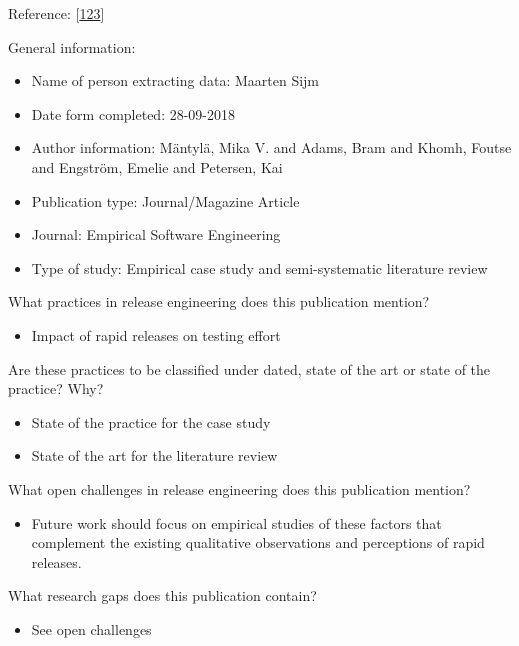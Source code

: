 \documentclass[]{book}
\providecommand{\tightlist}{%
  \setlength{\itemsep}{0pt}\setlength{\parskip}{0pt}}
\begin{document}
Reference: {[}\protect\hyperlink{ref-mantyla2015a}{123}{]}

General information:

\begin{itemize}
\tightlist
\item
  Name of person extracting data: Maarten Sijm
\item
  Date form completed: 28-09-2018
\item
  Author information: Mäntylä, Mika V. and Adams, Bram and Khomh, Foutse
  and Engström, Emelie and Petersen, Kai
\item
  Publication type: Journal/Magazine Article
\item
  Journal: Empirical Software Engineering
\item
  Type of study: Empirical case study and semi-systematic literature
  review
\end{itemize}

What practices in release engineering does this publication mention?

\begin{itemize}
\tightlist
\item
  Impact of rapid releases on testing effort
\end{itemize}

Are these practices to be classified under dated, state of the art or
state of the practice? Why?

\begin{itemize}
\tightlist
\item
  State of the practice for the case study
\item
  State of the art for the literature review
\end{itemize}

What open challenges in release engineering does this publication
mention?

\begin{itemize}
\tightlist
\item
  Future work should focus on empirical studies of these factors that
  complement the existing qualitative observations and perceptions of
  rapid releases.
\end{itemize}

What research gaps does this publication contain?

\begin{itemize}
\tightlist
\item
  See open challenges
\end{itemize}
\end{document}
